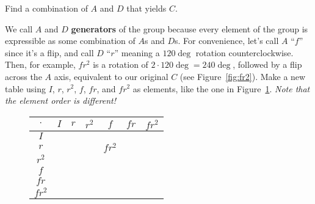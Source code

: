 \documentclass[../gatm_answers.tex]{subfiles}
\begin{document}
\begin{outer_problem}
\item Find a combination of $A$ and $D$ that yields $C$.
\end{outer_problem}

\begin{outer_problem}
\item We call $A$ and $D$ \textbf{generators} of the group because every element of the group is expressible as some combination of $A$s and $D$s. For convenience, let's call $A$ ``$f$'' since it's a flip, and call $D$ ``$r$'' meaning a $120\deg$ rotation counterclockwise. Then, for example, $fr^2$ is a rotation of $2\cdot 120\deg = 240\deg$, followed by a flip across the $A$ axis, equivalent to our original $C$ (see Figure~\ref{fig:fr2}). Make a new table using $I$, $r$, $r^2$, $f$, $fr$, and $fr^2$ as elements, like the one in Figure~\ref{fig:alttable}. \textit{Note that the element order is different!}
\end{outer_problem}

\begin{figure}[h]
	\begin{center}
		\begin{minipage}[b]{\textwidth}
			\centering
			\begin{tabular}{c|cccccc}
				\hline
				$\cdot$ & $I$ & $r$ & $r^2$ & $f$ & $fr$ & $fr^2$ \\ \hline 
				\rowcolor{light-gray}
				$I$    &   &   &   &   &   &   \\ 
				$r$    &   &   &   & $fr^2$  &   &   \\  
				\rowcolor{light-gray}
				$r^2$    &   &   &   &   &   &   \\ 
				$f$    &   &   &   &   &   &   \\  
				\rowcolor{light-gray}
				$fr$    &   &   &   &   &   &   \\ 
				$fr^2$    &   &   &   &   &   &   \\ \hline
			\end{tabular}
			\vspace*{0.5\baselineskip}
		\end{minipage}
	\end{center}
	\vspace*{-2\baselineskip}
	\begin{center}
		\begin{minipage}[t]{\textwidth}
			\label{fig:alttable}
		\end{minipage}
	\end{center}
	\vspace*{-2\baselineskip}
\end{figure}
\end{document}
